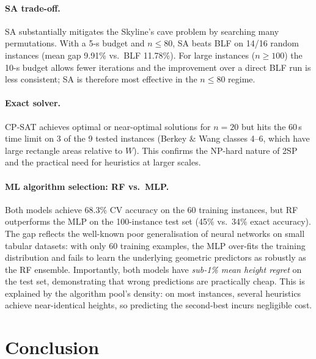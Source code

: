 \documentclass[11pt,a4paper]{article}
\begin{document}
\paragraph{SA trade-off.}
SA substantially mitigates the Skyline's cave problem by searching many
permutations.
With a 5-s budget and $n \le 80$, SA beats BLF on 14/16 random instances
(mean gap 9.91\% vs.\ BLF 11.78\%).
For large instances ($n \ge 100$) the 10-s budget allows fewer iterations
and the improvement over a direct BLF run is less consistent; SA is therefore
most effective in the $n \le 80$ regime.

\paragraph{Exact solver.}
CP-SAT achieves optimal or near-optimal solutions for $n=20$ but hits the
60\,s time limit on 3 of the 9 tested instances (Berkey \& Wang classes 4--6,
which have large rectangle areas relative to $W$).
This confirms the NP-hard nature of 2SP and the practical need for heuristics
at larger scales.

\paragraph{ML algorithm selection: RF vs.\ MLP.}
Both models achieve 68.3\% CV accuracy on the 60 training instances, but RF
outperforms the MLP on the 100-instance test set (45\% vs.\ 34\% exact
accuracy).
The gap reflects the well-known poor generalisation of neural networks on
small tabular datasets: with only 60 training examples, the MLP over-fits
the training distribution and fails to learn the underlying geometric
predictors as robustly as the RF ensemble.
Importantly, both models have \emph{sub-1\% mean height regret} on the test
set, demonstrating that wrong predictions are practically cheap.
This is explained by the algorithm pool's density: on most instances,
several heuristics achieve near-identical heights, so predicting the second-best
incurs negligible cost.

\section{Conclusion}
\end{document}
